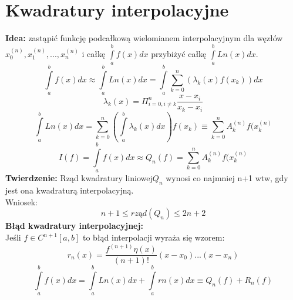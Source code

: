 \documentclass[12pt]{article}
\begin{document}
\section*{Kwadratury interpolacyjne}
\textbf{Idea:} zastąpić funkcję podcałkową wielomianem interpolacyjnym dla węzłów $x_0^{(n)}, x_1^{(n)},..., x_n^{(n)} $  i całkę $ \int\limits_{a}^{b}f(x)dx$ przybiżyć całkę $\int\limits_{a}^{b}Ln(x)dx$.\\
$$\int\limits_{a}^{b}f(x)dx \approx \int\limits_{a}^{b}Ln(x)dx = \int\limits_{a}^{b}\sum_{k=0}^n (\lambda_k(x)f(x_k))dx$$
$$ \lambda_k(x) = \Pi_{i=0,i \neq k}^{n} \frac{x-x_i}{x_k-x_i}$$
$$\int\limits_{a}^{b}Ln(x)dx = \sum_{k=0}^n (\int\limits_{a}^{b}\lambda_k(x)dx)f(x_k) \equiv \sum_{k=0}^n A_k^{(n)}f(x_k^{(n)} $$
$$ I(f) = \int\limits_{a}^{b}f(x)dx \approx Q_n(f) =  \sum_{k=0}^n A_k^{(n)}f(x_k^{(n)} $$
\linebreak
\textbf{Twierdzenie:} Rząd kwadratury liniowej$ Q_n$ wynosi co najmniej n+1 wtw, gdy jest ona kwadraturą interpolacyjną.\\
Wniosek: 
$$n+1 \le rząd(Q_n) \le 2n+2 $$
\linebreak
\textbf{Błąd kwadratury interpolacyjnej:}\\
Jeśli $f \in C^{n+1}[a,b]$ to błąd interpolacji wyraża się wzorem:
$$ r_n(x) = \frac{f^{(n+1)}\eta(x)}{(n+1)!}(x-x_0)...(x-x_n)$$
$$ \int\limits_{a}^{b}f(x)dx = \int\limits_{a}^{b}Ln(x)dx + \int\limits_{a}^{b}rn(x)dx \equiv Q_n(f) + R_n(f) $$
\newpage
{}
\setcounter{page}{2}
\end{document}
